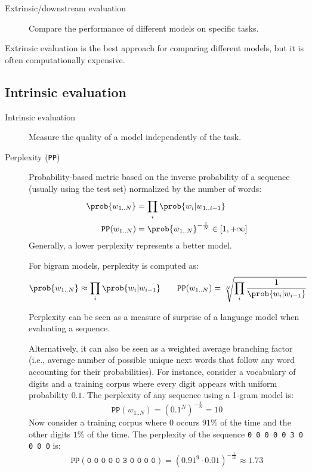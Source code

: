 \begin{description}
    \item[Extrinsic/downstream evaluation] 
        Compare the performance of different models on specific tasks.
\end{description}

\begin{remark}
    Extrinsic evaluation is the best approach for comparing different models, but it is often computationally expensive.
\end{remark}


\subsection{Intrinsic evaluation}

\begin{description}
    \item[Intrinsic evaluation] 
        Measure the quality of a model independently of the task.

    \item[Perplexity (\texttt{PP})] 
        Probability-based metric based on the inverse probability of a sequence (usually using the test set) normalized by the number of words:
        \[
            \begin{split}
                \prob{w_{1..N}} &= \prod_{i} \prob{w_i | w_{1..i-1}} \\
                \texttt{PP}(w_{1..N}) &= \prob{w_{1..N}}^{-\frac{1}{N}} \in [1, +\infty]
            \end{split}
        \]
        Generally, a lower perplexity represents a better model.

        \begin{example}
            For bigram models, perplexity is computed as:
            \[ 
                \prob{w_{1..N}} \approx \prod_{i} \prob{w_i | w_{i-1}}
                \qquad
                \texttt{PP}(w_{1..N}) = \sqrt[N]{\prod_{i} \frac{1}{\prob{w_i | w_{i-1}}}}
            \]
        \end{example}

        \begin{remark}
            Perplexity can be seen as a measure of surprise of a language model when evaluating a sequence.

            Alternatively, it can also be seen as a weighted average branching factor (i.e., average number of possible unique next words that follow any word accounting for their probabilities). For instance, consider a vocabulary of digits and a training corpus where every digit appears with uniform probability $0.1$. The perplexity of any sequence using a 1-gram model is:
            \[ \texttt{PP}(w_{1..N}) = \left( 0.1^{N} \right)^{-\frac{1}{N}} = 10 \]
            Now consider a training corpus where $0$ occurs $91\%$ of the time and the other digits $1\%$ of the time. The perplexity of the sequence \texttt{0 0 0 0 0 3 0 0 0 0} is:
            \[ \texttt{PP}(\texttt{0 0 0 0 0 3 0 0 0 0}) = \left( 0.91^9 \cdot 0.01 \right)^{-\frac{1}{10}} \approx 1.73 \]
        \end{remark}


\end{description}
